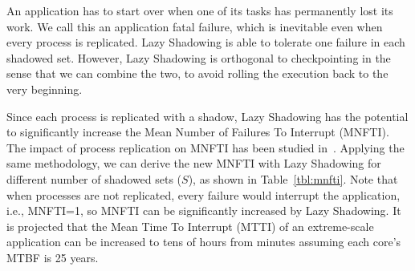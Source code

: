 An application has to start over when one of its tasks has permanently lost its work. We call this an application fatal failure, which is inevitable even when every process is replicated. Lazy Shadowing is able to 
tolerate one failure in each shadowed set. %
However, Lazy Shadowing is orthogonal to checkpointing in 
the sense that we can combine the two, to avoid rolling the execution back to the very beginning. 

Since each process is replicated with a shadow, Lazy Shadowing has the potential to significantly 
increase the Mean Number of Failures To Interrupt (MNFTI). %
The impact of process replication on MNFTI has been studied in~\cite{casanova_inria_2012}. %
Applying the same methodology, we can derive the new MNFTI
with Lazy Shadowing for different number of shadowed sets ($S$), as shown in Table~\ref{tbl:mnfti}. 
Note that when processes are not replicated, every failure would interrupt the application, i.e., MNFTI=1, so MNFTI can be significantly increased by Lazy Shadowing. 
It is projected that the Mean Time To Interrupt (MTTI) of an extreme-scale application can be increased to tens of hours from minutes assuming each core's MTBF is 25 years.
